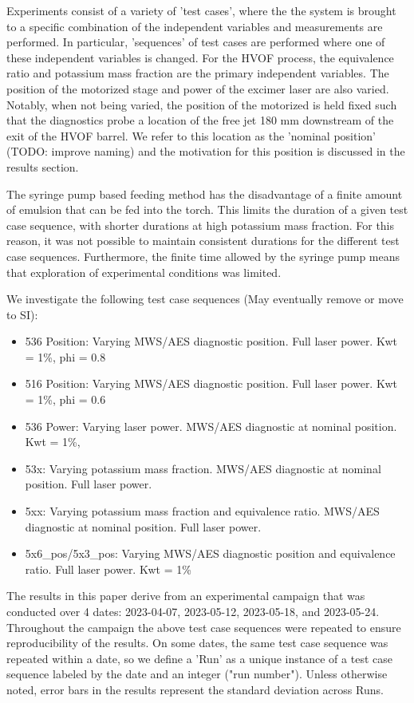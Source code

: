 Experiments consist of a variety of 'test cases', where the the system is brought to a specific combination of the independent variables and measurements are performed. In particular, 'sequences' of test cases are performed where one of these independent variables is changed. For the HVOF process, the equivalence ratio and potassium mass fraction are the primary independent variables. The position of the motorized stage and power of the excimer laser are also varied. Notably, when not being varied, the position of the motorized is held fixed such that the diagnostics probe a location of the free jet 180 mm downstream of the exit of the HVOF barrel. We refer to this location as the 'nominal position' (TODO: improve naming) and the motivation for this position is discussed in the results section.  

The syringe pump based feeding method has the disadvantage of a finite amount of emulsion that can be fed into the torch. This limits the duration of a given test case sequence, with shorter durations at high potassium mass fraction. For this reason, it was not possible to maintain consistent durations for the different test case sequences. Furthermore, the finite time allowed by the syringe pump means that exploration of experimental conditions was limited. 

We investigate the following test case sequences (May eventually remove or move to SI):
\begin{itemize}
    \item 536 Position: Varying MWS/AES diagnostic position. Full laser power. Kwt = 1\%, phi = 0.8
    \item 516 Position: Varying MWS/AES diagnostic position. Full laser power. Kwt = 1\%, phi = 0.6
    \item 536 Power: Varying laser power. MWS/AES diagnostic at nominal position. Kwt = 1\%, 
    \item 53x: Varying potassium mass fraction. MWS/AES diagnostic at nominal position. Full laser power.
    \item 5xx: Varying potassium mass fraction and equivalence ratio. MWS/AES diagnostic at nominal position. Full laser power.
    \item 5x6\_pos/5x3\_pos: Varying MWS/AES diagnostic position and equivalence ratio. Full laser power. Kwt = 1\%
\end{itemize}

The results in this paper derive from an experimental campaign that was conducted over 4 dates: 2023-04-07, 2023-05-12, 2023-05-18, and 2023-05-24. Throughout the campaign the above test case sequences were repeated to ensure reproducibility of the results. On some dates, the same test case sequence was repeated within a date, so we define a 'Run' as a unique instance of a test case sequence labeled by the date and an integer ("run number").  Unless otherwise noted, error bars in the results represent the standard deviation across Runs. 

